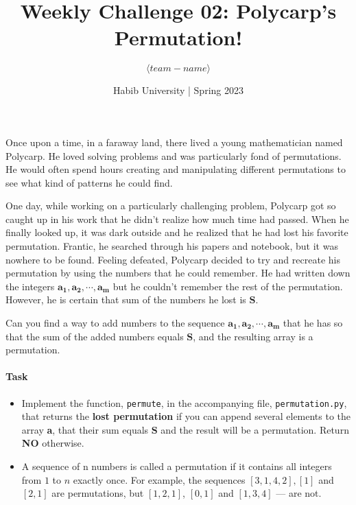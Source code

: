 \documentclass[a4paper]{exam}
\title{Weekly Challenge 02: Polycarp's Permutation!}
\author{$\langle team-name \rangle$}  %
\date{Habib University | Spring 2023}
\begin{document}
\maketitle

\begin{questions}

    Once upon a time, in a faraway land, there lived a young mathematician named Polycarp.
    He loved solving problems and was particularly fond of permutations. He would often
    spend hours creating and manipulating different permutations to see what kind of
    patterns he could find.

    One day, while working on a particularly challenging problem, Polycarp got so caught up
    in his work that he didn't realize how much time had passed. When he finally looked up,
    it was dark outside and he realized that he had lost his favorite permutation. Frantic,
    he searched through his papers and notebook, but it was nowhere to be found. Feeling
    defeated, Polycarp decided to try and recreate his permutation by using the numbers
    that he could remember. He had written down the integers $\mathbf{a_1, a_2, \cdots , a_m}$
    but he couldn't remember the rest of the permutation.  However, he is certain that
    sum of the numbers he lost is $\mathbf{S}$.

    Can you find a way to add numbers to the sequence $\mathbf{a_1,a_2,\cdots, a_m}$ that he has
    so that the sum of the added numbers equals $\mathbf{S}$, and the resulting array is a permutation.

    \paragraph{Task}
    \begin{itemize}
        \item Implement the function, \texttt{permute}, in the accompanying file,  \texttt{permutation.py},
        that returns the \textbf{lost permutation} if you can append several elements to the array \textbf{a},
        that their sum equals $\mathbf{S}$ and the result will be a permutation. Return \textbf{NO} otherwise.
    
        \item A sequence of n numbers is called a permutation if it contains all integers from $1$ to $n$
              exactly once. For example, the sequences $[3,1,4,2], [1]$  and $[2,1]$ are permutations, but $[1,2,1]$,
              $[0,1]$ and $[1,3,4]$ — are not.


\end{itemize}
\end{questions}
\end{document}
